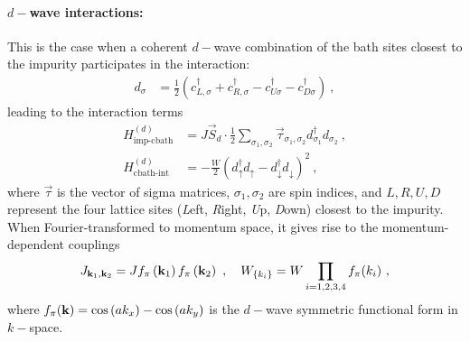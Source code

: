 \documentclass[reprint,hidelinks]{revtex4-2}
\begin{document}
\paragraph{\(d-\)wave interactions:} This is the case when a coherent \(d-\)wave combination of the bath sites closest to the impurity participates in the interaction:
\begin{equation}\begin{aligned}
	d_{\sigma} &= \frac{1}{2}\left(c^\dagger_{L,\sigma} + c^\dagger_{R,\sigma} - c^\dagger_{U\sigma} - c^\dagger_{D\sigma}\right)~,
\end{aligned}\end{equation}
leading to the interaction terms
\begin{equation}\begin{aligned}
	H^{(d)}_\text{imp-cbath} &= J\vec{S}_d\cdot\frac{1}{2}\sum_{\sigma_1,\sigma_2}\vec{\tau}_{\sigma_1,\sigma_2} d^\dagger_{\sigma_1}d_{\sigma_2}~,\\
	H^{(d)}_\text{cbath-int} &= -\frac{W}{2}\left(d^\dagger_{\uparrow}d_{\uparrow} - d^\dagger_{\downarrow}d_{\downarrow}\right)^2~,
\end{aligned}\end{equation}
where \(\vec \tau\) is the vector of sigma matrices, \(\sigma_1,\sigma_2\) are spin indices, and \(L,R,U,D\) represent the four lattice sites ({\it L}eft, {\it R}ight, {\it U}p, {\it D}own) closest to the impurity. When Fourier-transformed to momentum space, it gives rise to the momentum-dependent couplings
\begin{equation}\begin{aligned}\label{d-wave k-space}
	J_{{\bf k}_1, {\bf k}_2} = J f_{\pi}\left({\bf k}_1\right) f_{\pi}\left({\bf k}_2\right) ~,\quad W_{\left\{ k_i \right\} } = W\prod_{i=1,2,3,4}f_{\pi}(k_i)~,
\end{aligned}\end{equation}
where \(f_{\pi}({\bf k}) = \cos\left( ak_x \right) - \cos\left( ak_y \right) \) is the \(d-\)wave symmetric functional form in \(k-\)space.
\end{document}
